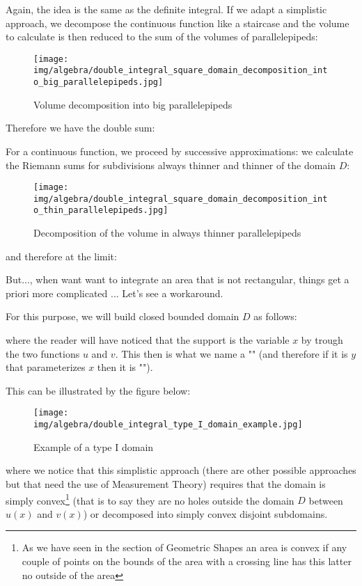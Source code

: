 	Again, the idea is the same as the definite integral. If we adapt a simplistic approach, we decompose the continuous function like a staircase and the volume to calculate is then reduced to the sum of the volumes of parallelepipeds:
		
	\begin{figure}[H]
		\centering
		\texttt{[image: img/algebra/double\_integral\_square\_domain\_decomposition\_into\_big\_parallelepipeds.jpg]}
		\caption{Volume decomposition into big parallelepipeds}
	\end{figure}
	Therefore we have the double sum:
	
	For a continuous function, we proceed by successive approximations: we calculate the Riemann sums for subdivisions always thinner and thinner of the domain $D$:
	\begin{figure}[H]
		\centering
		\texttt{[image: img/algebra/double\_integral\_square\_domain\_decomposition\_into\_thin\_parallelepipeds.jpg]}
		\caption{Decomposition of the volume in always thinner parallelepipeds}
	\end{figure}
	and therefore at the limit:
	
	But..., when want want to integrate an area that is not rectangular, things get a priori more complicated ... Let's see a workaround.
	
	For this purpose, we will build closed bounded domain $D$ as follows:
	
	where the reader will have noticed that the support is the variable $x$ by trough the two functions $u$ and $v$. This then is what we name a "" (and therefore if it is $y$ that parameterizes $x$ then it is "").

	This can be illustrated by the figure below:
	\begin{figure}[H]
		\centering
		\texttt{[image: img/algebra/double\_integral\_type\_I\_domain\_example.jpg]}
		\caption{Example of a type I domain}
	\end{figure}
	where we notice that this simplistic approach (there are other possible approaches but that need the use of Measurement Theory) requires that the domain is simply convex\footnote{As we have seen in the section of Geometric Shapes an area is convex if any couple of points on the bounds of the area with a crossing line has this latter no outside of the area} (that is to say they are no holes outside the domain $D$ between $u (x)$ and $v (x)$) or decomposed into simply convex disjoint subdomains.

